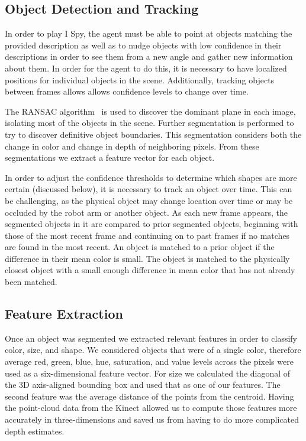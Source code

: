 \documentclass[11pt]{article}
\begin{document}
\subsection{Object Detection and Tracking}
In order to play I Spy, the agent must be able to point at objects matching the
provided description as well as to nudge objects with low confidence in their
descriptions in order to see them from a new angle and gather new information
about them. In order for the agent to do this, it is necessary to have localized
positions for individual objects in the scene. Additionally, tracking objects
between frames allows allows confidence levels to change over time.

The RANSAC algorithm~\cite{fischler1981random} is used to discover the dominant
plane in each image, isolating most of the objects in the scene. Further
segmentation is performed to try to discover definitive object boundaries. This
segmentation considers both the change in color and change in depth of neighboring
pixels.
From these segmentations we extract a feature vector for each object.

In order to adjust the confidence thresholds to determine which shapes are more
certain (discussed below), it is necessary to track an object over time. This can
be challenging, as the physical object may change location over time or may be
occluded by the robot arm or another object. As each new frame appears, the
segmented objects in it are compared to prior segmented objects, beginning with
those of the most recent frame and continuing on to past frames if no matches are
found in the most recent. An object is matched to a prior object if the difference
in their mean color is small. The object is matched to the physically closest object
with a small enough difference in mean color that has not already been matched.

\subsection{Feature Extraction}

Once an object was segmented we extracted relevant features in order to classify
color, size, and shape. We considered objects that were of a single color, therefore
average red, green, blue, hue, saturation, and value levels across the pixels were
used as a six-dimensional feature vector. For size we calculated the diagonal of the 3D
axis-aligned bounding box and used that as one of our features. The second feature was
the average distance of the points from the centroid. Having the point-cloud data from
the Kinect allowed us to compute those features more accurately in three-dimensions
and saved us from having to do more complicated depth estimates.
\end{document}
